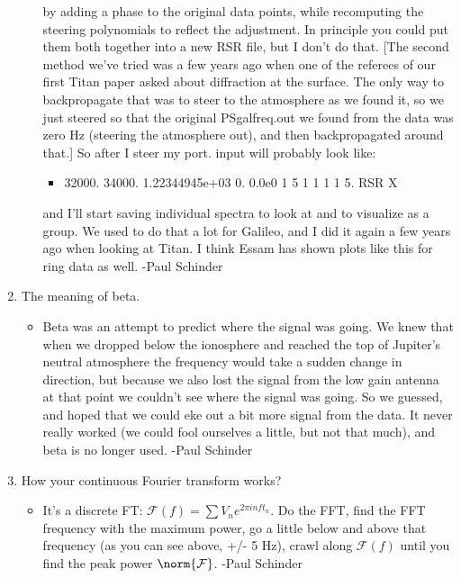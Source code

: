 \documentclass[crop=false,class=article,oneside]{standalone}
\begin{document}
\begin{enumerate}
\begin{itemize}
              by adding a phase to the original data points, while
              recomputing the steering polynomials to reflect the
              adjustment.  In principle you could put them both
              together into a new RSR file, but I don’t do that.
              [The second method we’ve tried was a few years ago
              when one of the referees of our first Titan paper
              asked about diffraction at the surface.  The only
              way to backpropagate that was to steer to the atmosphere
              as we found it, so we just steered so that the original
              PSgalfreq.out we found from the data was zero Hz
              (steering the atmosphere out), and then backpropagated
              around that.] So after I steer my port.
              input will probably look like:
            \begin{itemize}
                \item 32000. 34000. 1.22344945e+03 0. 0.0e0
                      1 5 1 1 1 1 5. RSR X
            \end{itemize}
            and I’ll start saving individual spectra to look at and
            to visualize as a group.  We used to do that a lot for
            Galileo, and I did it again a few years ago when looking
            at Titan.  I think Essam has shown plots like this for
            ring data as well. -Paul Schinder
    \end{itemize}
    \item The meaning of beta.
    \begin{itemize}
        \item Beta was an attempt to predict where the signal was going.  We knew that when we dropped below the ionosphere and reached the top of Jupiter’s neutral atmosphere the frequency would take a sudden change in direction, but because we also lost the signal from the low gain antenna at that point we couldn’t see where the signal was going.  So we guessed, and hoped that we could eke out a bit more signal from the data.  It never really worked (we could fool ourselves a little, but not that much), and beta is no longer used. -Paul Schinder
    \end{itemize}
    \item How your continuous Fourier transform works?
    \begin{itemize}
        \item It’s a discrete FT: $\mathcal{F}(f) = \sum V_n e^{2\pi i n f t_n}$. Do the FFT, find the FFT frequency with the maximum power, go a little below and above that frequency (as you can see above, +/- 5 Hz), crawl along $\mathcal{F}(f)$ until you find the peak power $\norm{\mathcal{F}}$. -Paul Schinder

\end{itemize}
\end{enumerate}
\end{document}
